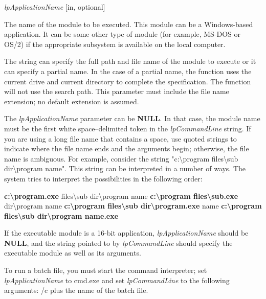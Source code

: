 \documentclass[a4paper]{book}
\newenvironment{customindent}[1]
{\begin{list}{}
	{\setlength{\leftmargin}{#1}}
    	\item[]
    }
{\end{list}}
\begin{document}
\noindent \textit{lpApplicationName} [in, optional]
\begin{customindent}{1cm}
    The name of the module to be executed. This module can be a Windows-based application. It can be some other type of module (for example, MS-DOS or OS/2) if the appropriate subsystem is available on the local computer.

    The string can specify the full path and file name of the module to execute or it can specify a partial name. In the case of a partial name, the function uses the current drive and current directory to complete the specification. The function will not use the search path. This parameter must include the file name extension; no default extension is assumed.

    The \textit{lpApplicationName} parameter can be \textbf{NULL}. In that case, the module name must be the first white space–delimited token in the \textit{lpCommandLine} string. If you are using a long file name that contains a space, use quoted strings to indicate where the file name ends and the arguments begin; otherwise, the file name is ambiguous. For example, consider the string "c:\textbackslash program files\textbackslash sub dir\textbackslash program name". This string can be interpreted in a number of ways. The system tries to interpret the possibilities in the following order:

        \textbf{c:\textbackslash program.exe} files\textbackslash sub dir\textbackslash program name\newline
        \textbf{c:\textbackslash program files\textbackslash sub.exe} dir\textbackslash program name\newline
        \textbf{c:\textbackslash program files\textbackslash sub dir\textbackslash program.exe} name\newline
        \textbf{c:\textbackslash program files\textbackslash sub dir\textbackslash program name.exe}\newline

    If the executable module is a 16-bit application, \textit{lpApplicationName} should be \textbf{NULL}, and the string pointed to by \textit{lpCommandLine} should specify the executable module as well as its arguments.

    To run a batch file, you must start the command interpreter; set \textit{lpApplicationName} to cmd.exe and set \textit{lpCommandLine} to the following arguments: /c plus the name of the batch file.
\end{customindent}
\end{document}
